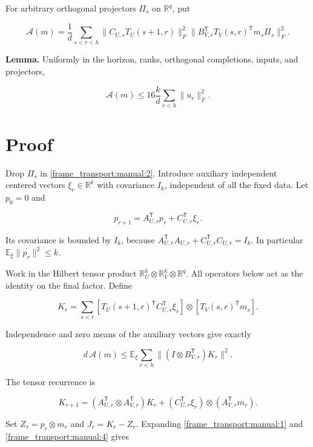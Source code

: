 \documentclass[11pt,oneside,openany,a4paper]{book}
\numberwithin{equation}{chapter}
\theoremstyle{definition}
\theoremstyle{remark}
\begin{document}
For arbitrary orthogonal projectors \(\Pi_s\) on \(\mathbb R^q\), put

\[
\mathscr A(m)=\frac1d\sum_{s<r<h}
\|C_{U,s}T_U(s+1,r)\|_F^2
\|B_{V,r}^{\mathsf T}T_V(s,r)^{\mathsf T}m_s\Pi_s\|_F^2.
\tag{\thechapter.2}\label{frame_transport:manual:2}
\]

\textbf{Lemma.} Uniformly in the horizon, ranks, orthogonal completions, inputs, and projectors,

\[
\boxed{\mathscr A(m)\le16\frac{k}{d}\sum_{r<h}\|u_r\|_F^2.}
\tag{\thechapter.3}\label{frame_transport:manual:3}
\]

\section{Proof}\label{frame_transport:proof}

Drop \(\Pi_s\) in \eqref{frame_transport:manual:2}. Introduce auxiliary independent centered vectors \(\xi_r\in\mathbb R^k\) with covariance \(I_k\), independent of all the fixed data. Let \(p_0=0\) and

\[
p_{r+1}=A_{U,r}^{\mathsf T}p_r+C_{U,r}^{\mathsf T}\xi_r.
\tag{\thechapter.4}\label{frame_transport:manual:4}
\]

Its covariance is bounded by \(I_k\), because \(A_{U,r}^{\mathsf T}A_{U,r}+C_{U,r}^{\mathsf T}C_{U,r}=I_k\). In particular \(\mathbb E_\xi\|p_r\|^2\le k\).

Work in the Hilbert tensor product \(\mathbb R^k_U\otimes\mathbb R^k_V\otimes\mathbb R^q\). All operators below act as the identity on the final factor. Define

\[
K_r=\sum_{s<r}
\left[T_U(s+1,r)^{\mathsf T}C_{U,s}^{\mathsf T}\xi_s\right]
\otimes\left[T_V(s,r)^{\mathsf T}m_s\right].
\tag{\thechapter.5}\label{frame_transport:manual:5}
\]

Independence and zero means of the auxiliary vectors give exactly

\[
d\,\mathscr A(m)\le
\mathbb E_\xi\sum_{r<h}\|(I\otimes B_{V,r}^{\mathsf T})K_r\|^2.
\tag{\thechapter.6}\label{frame_transport:manual:6}
\]

The tensor recurrence is

\[
K_{r+1}=(A_{U,r}^{\mathsf T}\otimes A_{V,r}^{\mathsf T})K_r
+(C_{U,r}^{\mathsf T}\xi_r)\otimes(A_{V,r}^{\mathsf T}m_r).
\tag{\thechapter.7}\label{frame_transport:manual:7}
\]

Set \(Z_r=p_r\otimes m_r\) and \(J_r=K_r-Z_r\). Expanding \eqref{frame_transport:manual:1} and \eqref{frame_transport:manual:4} gives
\end{document}
